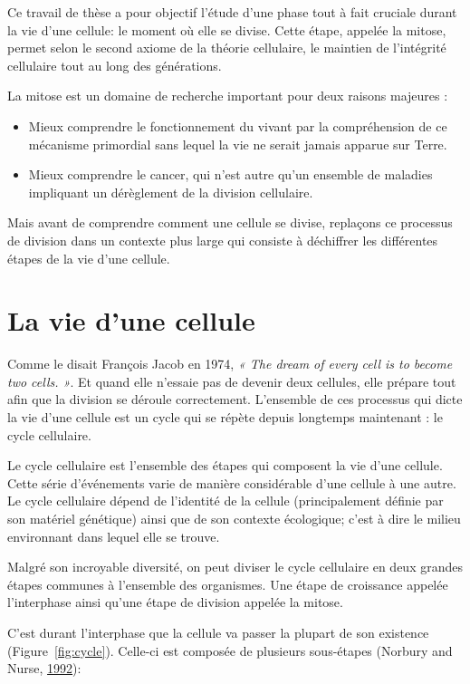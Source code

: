 \documentclass[12pt,a4paper,twoside,openright]{book}
\providecommand{\tightlist}{%
  \setlength{\itemsep}{0pt}\setlength{\parskip}{0pt}}
\begin{document}
Ce travail de thèse a pour objectif l'étude d'une phase tout à fait
cruciale durant la vie d'une cellule: le moment où elle se divise. Cette
étape, appelée la mitose, permet selon le second axiome de la théorie
cellulaire, le maintien de l'intégrité cellulaire tout au long des
générations.

La mitose est un domaine de recherche important pour deux raisons
majeures :

\begin{itemize}
\tightlist
\item
  Mieux comprendre le fonctionnement du vivant par la compréhension de
  ce mécanisme primordial sans lequel la vie ne serait jamais apparue
  sur Terre.
\item
  Mieux comprendre le cancer, qui n'est autre qu'un ensemble de maladies
  impliquant un dérèglement de la division cellulaire.
\end{itemize}

Mais avant de comprendre comment une cellule se divise, replaçons ce
processus de division dans un contexte plus large qui consiste à
déchiffrer les différentes étapes de la vie d'une cellule.

\section{La vie d'une cellule}\label{la-vie-dune-cellule}

Comme le disait François Jacob en 1974, \emph{« The dream of every cell
is to become two cells. »}. Et quand elle n'essaie pas de devenir deux
cellules, elle prépare tout afin que la division se déroule
correctement. L'ensemble de ces processus qui dicte la vie d'une cellule
est un cycle qui se répète depuis longtemps maintenant : le cycle
cellulaire.

Le cycle cellulaire est l'ensemble des étapes qui composent la vie d'une
cellule. Cette série d'événements varie de manière considérable d'une
cellule à une autre. Le cycle cellulaire dépend de l'identité de la
cellule (principalement définie par son matériel génétique) ainsi que de
son contexte écologique; c'est à dire le milieu environnant dans lequel
elle se trouve.

Malgré son incroyable diversité, on peut diviser le cycle cellulaire en
deux grandes étapes communes à l'ensemble des organismes. Une étape de
croissance appelée l'interphase ainsi qu'une étape de division appelée
la mitose.

C'est durant l'interphase que la cellule va passer la plupart de son
existence (Figure~\ref{fig:cycle}). Celle-ci est composée de plusieurs
sous-étapes (Norbury and Nurse, \hyperref[ref-Norbury1992]{1992}):
\end{document}
